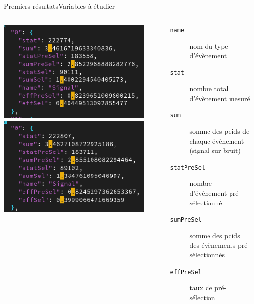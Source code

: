 \documentclass[9pt]{beamer}
\begin{document}
\begin{frame}{Premiers résultats}{Variables à étudier}

	\begin{columns}
    
        \begin{column}{0.3\textwidth}
			\includegraphics[width=0.9\textwidth]{../img/stats_bb_original_run1_run1.png} 
			\includegraphics[width=0.9\textwidth]{../img/stats_bb_original_run2_run1.png}
        \end{column}
        
		\begin{column}{0.65\textwidth}
			\begin{description}
				\item[\texttt{name}] nom du type d'évènement
				\item[\texttt{stat}] nombre total d'évènement mesuré
				\item[\texttt{sum}] somme des poids de chaque évènement (signal sur bruit)
				\item[\texttt{statPreSel}] nombre d'évènement pré-sélectionné
				\item[\texttt{sumPreSel}] somme des poids des évènements pré-sélectionnés
				\item[\texttt{effPreSel}] taux de pré-sélection
				

\end{description}
\end{column}
\end{columns}
\end{frame}
\end{document}
